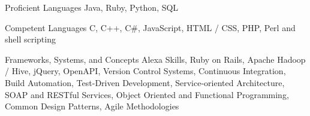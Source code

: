 
\begin{cvskills}

\cvskill
{Proficient Languages}
{Java, Ruby, Python, SQL}

\cvskill
{Competent Languages}
{C, C++, C\#, JavaScript, HTML / CSS, PHP, Perl and shell scripting}

\cvskill
{Frameworks, Systems, and Concepts}
{Alexa Skills, Ruby on Rails, Apache Hadoop / Hive, jQuery, OpenAPI, Version Control Systems, Continuous Integration, Build Automation, Test-Driven Development, Service-oriented Architecture, SOAP and RESTful Services, Object Oriented and Functional Programming, Common Design Patterns, Agile Methodologies}

\end{cvskills}